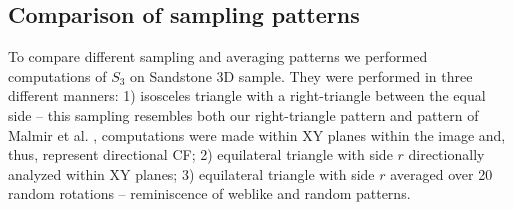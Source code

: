 \documentclass[reprint,amsmath,amssymb,aps,pre,showkeys,showpacs]{revtex4-1}
\begin{document}
\subsection{Comparison of sampling patterns}
\label{sec:compare-patterns}
To compare different sampling and averaging patterns we performed computations
of $S_3$ on Sandstone 3D sample.  They were performed in three different
manners: 1) isosceles triangle with a right-triangle between the equal side --
this sampling resembles both our right-triangle pattern and pattern of Malmir et
al. \cite{malmir2018}, computations were made within XY planes within the image
and, thus, represent directional CF; 2) equilateral triangle with side $r$
directionally analyzed within XY planes; 3) equilateral triangle with side $r$
averaged over 20 random rotations -- reminiscence of weblike and random
patterns.
\end{document}
